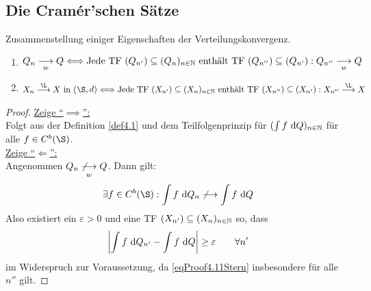 \subsection*{Die Cramér'schen Sätze}
Zusammenstellung einiger Eigenschaften der Verteilungskonvergenz.

\begin{satz}\label{satz4.11}\enter
\begin{enumerate}[label=(\arabic*)]
\item $\begin{aligned}
Q_n\underset{w}{\overset{}{\longrightarrow}} Q
\Longleftrightarrow
\text{Jede TF }(Q_{n'})\subseteq(Q_n)_{n\in\mathbb{N}}\text{ enthält TF }(Q_{n''})\subseteq(Q_{n'}):Q_{n''}\underset{w}{\overset{}{\longrightarrow}} Q
\end{aligned}$
\item $\begin{aligned}
X_n\stackrel{\L}{\longrightarrow} X\text{ in }(\S,d)\Longleftrightarrow\text{Jede TF }(X_{n'})\subseteq(X_n)_{n\in\N}\text{ enthält TF }(X_{n''})\subseteq(X_{n'}):X_{n''}\stackrel{\L}{\longrightarrow} X
\end{aligned}$
\end{enumerate}
\end{satz}
\begin{proof}
\underline{Zeige ``$\implies$'':}\\
Folgt aus der Definition \ref{def4.1} und dem Teilfolgenprinzip für $(\int f\text{ d} Q)_{n\in\mathbb{N}}$ für alle $f\in C^b(\S)$.\\

\underline{Zeige ``$\Longleftarrow$'':}\\
Angenommen $Q_n\underset{w}{\overset{}{\not\longrightarrow}} Q$. Dann gilt:
\begin{align*}
\exists f\in C^b(\S):\int\limits f\d Q_n\not\longrightarrow\int\limits f\d Q
\end{align*}
Also existiert ein $\varepsilon>0$ und eine TF $(X_{n'})\subseteq(X_n)_{n\in\mathbb{N}}$ so, dass
\begin{align}\label{eqProof4.11Stern}
\left|\int\limits f\text{ d} Q_{n'}-\int\limits f\text{ d} Q\right|\geq\varepsilon\qquad\forall n'
\end{align}
im Widerspruch zur Voraussetzung, da \eqref{eqProof4.11Stern} insbesondere für alle $n''$ gilt.
\end{proof}

